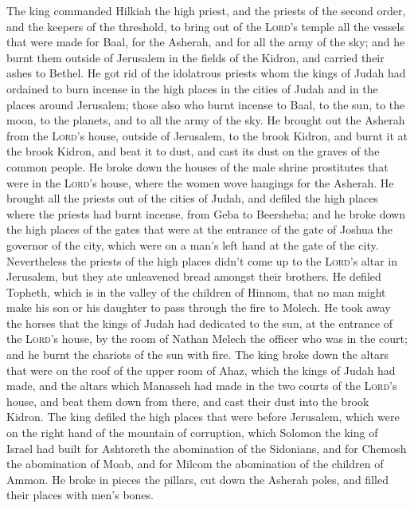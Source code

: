  The king commanded Hilkiah the high priest, and the
priests of the second order, and the keepers of the threshold, to bring
out of the \textsc{Lord}'s temple all the vessels that were made for
Baal, for the Asherah, and for all the army of the sky; and he burnt
them outside of Jerusalem in the fields of the Kidron, and carried their
ashes to Bethel.  He got rid of the idolatrous priests
whom the kings of Judah had ordained to burn incense in the high places
in the cities of Judah and in the places around Jerusalem; those also
who burnt incense to Baal, to the sun, to the moon, to the planets, and
to all the army of the sky.  He brought out the Asherah
from the \textsc{Lord}'s house, outside of Jerusalem, to the brook
Kidron, and burnt it at the brook Kidron, and beat it to dust, and cast
its dust on the graves of the common people.  He broke
down the houses of the male shrine prostitutes that were in the
\textsc{Lord}'s house, where the women wove hangings for the Asherah.
 He brought all the priests out of the cities of Judah,
and defiled the high places where the priests had burnt incense, from
Geba to Beersheba; and he broke down the high places of the gates that
were at the entrance of the gate of Joshua the governor of the city,
which were on a man's left hand at the gate of the city. 
Nevertheless the priests of the high places didn't come up to the
\textsc{Lord}'s altar in Jerusalem, but they ate unleavened bread
amongst their brothers.  He defiled Topheth, which is in
the valley of the children of Hinnom, that no man might make his son or
his daughter to pass through the fire to Molech.  He took
away the horses that the kings of Judah had dedicated to the sun, at the
entrance of the \textsc{Lord}'s house, by the room of Nathan Melech the
officer who was in the court; and he burnt the chariots of the sun with
fire.  The king broke down the altars that were on the
roof of the upper room of Ahaz, which the kings of Judah had made, and
the altars which Manasseh had made in the two courts of the
\textsc{Lord}'s house, and beat them down from there, and cast their
dust into the brook Kidron.  The king defiled the high
places that were before Jerusalem, which were on the right hand of the
mountain of corruption, which Solomon the king of Israel had built for
Ashtoreth the abomination of the Sidonians, and for Chemosh the
abomination of Moab, and for Milcom the abomination of the children of
Ammon.  He broke in pieces the pillars, cut down the
Asherah poles, and filled their places with men's bones.


